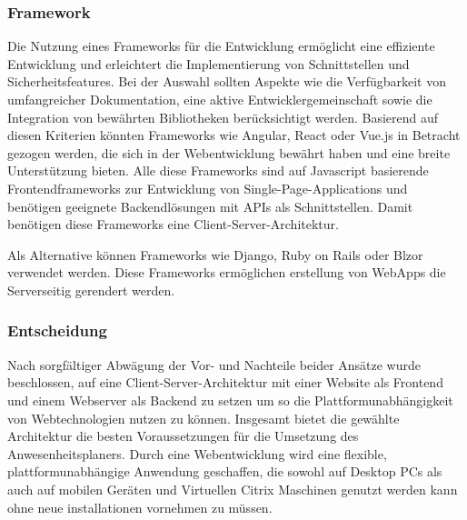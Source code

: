 \subsubsection{Framework}
\label{sec:Framework}
Die Nutzung eines Frameworks für die Entwicklung ermöglicht eine effiziente Entwicklung und erleichtert die Implementierung von Schnittstellen und Sicherheitsfeatures. Bei der Auswahl sollten Aspekte wie die Verfügbarkeit von umfangreicher Dokumentation, eine aktive Entwicklergemeinschaft sowie die Integration von bewährten Bibliotheken berücksichtigt werden. Basierend auf diesen Kriterien könnten Frameworks wie Angular, React oder Vue.js in Betracht gezogen werden, die sich in der Webentwicklung bewährt haben und eine breite Unterstützung bieten. Alle diese Frameworks sind auf Javascript basierende Frontendframeworks zur Entwicklung von Single-Page-Applications und benötigen geeignete Backendlösungen mit APIs als Schnittstellen. Damit benötigen diese Frameworks eine Client-Server-Architektur.

Als Alternative können Frameworks wie Django, Ruby on Rails oder Blzor verwendet werden. Diese Frameworks ermöglichen erstellung von WebApps die Serverseitig gerendert werden.   

\subsubsection{Entscheidung}
\label{sec:Entscheidung}
Nach sorgfältiger Abwägung der Vor- und Nachteile beider Ansätze wurde beschlossen, auf eine Client-Server-Architektur mit einer Website als Frontend und einem Webserver als Backend zu setzen um so die Plattformunabhängigkeit von Webtechnologien nutzen zu können. Insgesamt bietet die gewählte Architektur die besten Voraussetzungen für die Umsetzung des Anwesenheitsplaners. Durch eine Webentwicklung wird eine flexible, plattformunabhängige Anwendung geschaffen, die sowohl auf Desktop PCs als auch auf mobilen Geräten und Virtuellen Citrix Maschinen genutzt werden kann ohne neue installationen vornehmen zu müssen.




